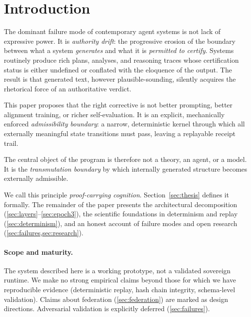 \documentclass[11pt,a4paper]{article}
\theoremstyle{plain}
\theoremstyle{definition}
\theoremstyle{remark}
\begin{document}
\section{Introduction}
\label{sec:intro}

The dominant failure mode of contemporary agent systems is not lack of expressive
power. It is \emph{authority drift}: the progressive erosion of the boundary
between what a system \emph{generates} and what it is \emph{permitted to certify}.
Systems routinely produce rich plans, analyses, and reasoning traces whose
certification status is either undefined or conflated with the eloquence of the
output. The result is that generated text, however plausible-sounding,
silently acquires the rhetorical force of an authoritative verdict.

This paper proposes that the right corrective is not better prompting,
better alignment training, or richer self-evaluation.
It is an explicit, mechanically enforced
\emph{admissibility boundary}: a narrow, deterministic kernel through which
all externally meaningful state transitions must pass, leaving a replayable
receipt trail.

The central object of the program is therefore not a theory, an agent, or a model.
It is the \emph{transmutation boundary} by which internally generated structure
becomes externally admissible.

We call this principle \emph{proof-carrying cognition}.
Section~\ref{sec:thesis} defines it formally.
The remainder of the paper presents the architectural decomposition
(\cref{sec:layers}--\ref{sec:epoch3}),
the scientific foundations in determinism and replay (\cref{sec:determinism}),
and an honest account of failure modes and open research (\cref{sec:failures,sec:research}).

\paragraph{Scope and maturity.}
The system described here is a working prototype, not a validated sovereign runtime.
We make no strong empirical claims beyond those for which we have reproducible
evidence (deterministic replay, hash chain integrity, schema-level validation).
Claims about federation (\cref{sec:federation}) are marked as design directions.
Adversarial validation is explicitly deferred (\cref{sec:failures}).

\end{document}

